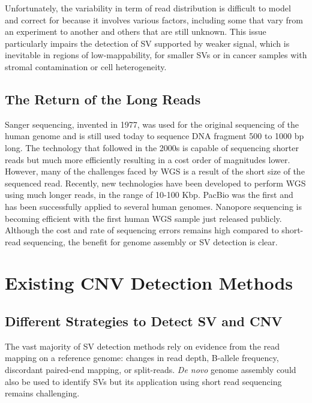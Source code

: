 Unfortunately, the variability in term of read distribution is difficult to model and correct for because it involves various factors, including some that vary from an experiment to another and others that are still unknown.
This issue particularly impairs the detection of SV supported by weaker signal, which is inevitable in regions of low-mappability, for smaller SVs or in cancer samples with stromal contamination or cell heterogeneity.

\subsection{The Return of the Long Reads}
Sanger sequencing, invented in 1977\cite{Sanger1977}, was used for the original sequencing of the human genome\cite{Lander2001} and is still used today to sequence DNA fragment 500 to 1000 bp long.
The technology that followed in the 2000s is capable of sequencing shorter reads but much more efficiently resulting in a cost order of magnitudes lower.
However, many of the challenges faced by WGS is a result of the short size of the sequenced read.
Recently, new technologies have been developed to perform WGS using much longer reads, in the range of 10-100 Kbp.
PacBio was the first and has been successfully applied to several human genomes\cite{Chaisson2014,Pendleton2015,Huddleston2016}.
Nanopore sequencing is becoming efficient with the first human WGS sample just released publicly\cite{Jain2018}.
Although the cost and rate of sequencing errors remains high compared to short-read sequencing, the benefit for genome assembly or SV detection is clear.


\section{Existing CNV Detection Methods}
\label{intro:methods}

\subsection{Different Strategies to Detect SV and CNV}

The vast majority of SV detection methods rely on evidence from the read mapping on a reference genome: changes in read depth, B-allele frequency, discordant paired-end mapping, or split-reads.
{\it De novo} genome assembly could also be used to identify SVs but its application using short read sequencing remains challenging.

